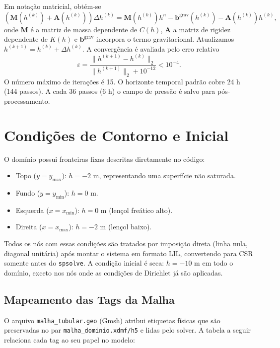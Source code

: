 \documentclass[a4paper,12pt]{article}
\begin{document}
Em notação matricial, obtém-se
\begin{equation}
    \left(\mathbf{M}(h^{(k)}) + \mathbf{A}(h^{(k)})\right)\Delta h^{(k)} = \mathbf{M}(h^{(k)}) h^{n} - \mathbf{b}^{\text{grav}}(h^{(k)}) - \mathbf{A}(h^{(k)})h^{(k)},
\end{equation}
onde $\mathbf{M}$ é a matriz de massa dependente de $C(h)$, $\mathbf{A}$ a matriz de rigidez dependente de $K(h)$ e $\mathbf{b}^{\text{grav}}$ incorpora o termo gravitacional. Atualizamos $h^{(k+1)} = h^{(k)} + \Delta h^{(k)}$. A convergência é avaliada pelo erro relativo
\begin{equation}
    \varepsilon = \frac{\lVert h^{(k+1)} - h^{(k)} \rVert_2}{\lVert h^{(k+1)} \rVert_2 + 10^{-12}} < 10^{-4}.
\end{equation}
O número máximo de iterações é 15. O horizonte temporal padrão cobre 24 h (144 passos). A cada 36 passos (6 h) o campo de pressão é salvo para pós-processamento.

\section{Condições de Contorno e Inicial}
O domínio possui fronteiras fixas descritas diretamente no código:
\begin{itemize}
    \item Topo ($y = y_{\max}$): $h = -2$ m, representando uma superfície não saturada.
    \item Fundo ($y = y_{\min}$): $h = 0$ m.
    \item Esquerda ($x = x_{\min}$): $h = 0$ m (lençol freático alto).
    \item Direita ($x = x_{\max}$): $h = -2$ m (lençol baixo).
\end{itemize}
Todos os nós com essas condições são tratados por imposição direta (linha nula, diagonal unitária) após montar o sistema em formato LIL, convertendo para CSR somente antes do \texttt{spsolve}. A condição inicial é seca: $h = -10$ m em todo o domínio, exceto nos nós onde as condições de Dirichlet já são aplicadas.

\subsection{Mapeamento das Tags da Malha}
O arquivo \texttt{malha\_tubular.geo} (Gmsh) atribui etiquetas físicas que são preservadas no par \texttt{malha\_dominio.xdmf/h5} e lidas pelo solver. A tabela a seguir relaciona cada tag ao seu papel no modelo:
\end{document}
